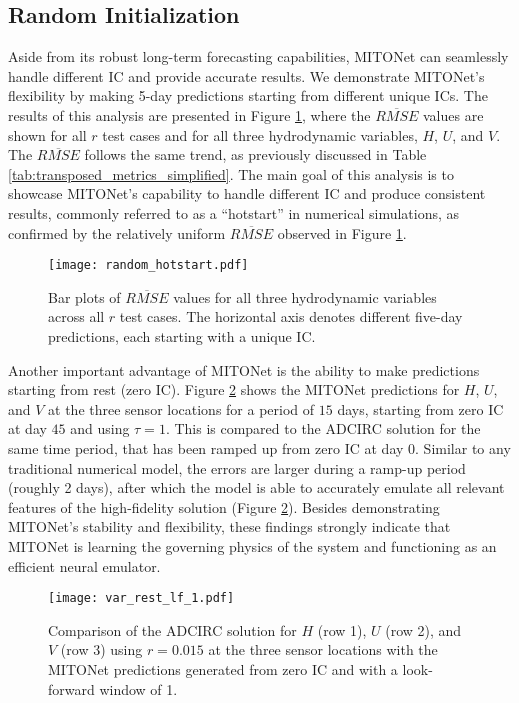 \documentclass[draft]{agujournal2019}
\begin{document}
\subsection{Random Initialization}

Aside from its robust long-term forecasting capabilities, MITONet can seamlessly handle different IC and provide accurate results. We demonstrate MITONet's flexibility by making 5-day predictions starting from different unique ICs. The results of this analysis are presented in Figure \ref{fig:random_hot}, where the $\overline{RMSE}$ values are shown for all $r$ test cases and for all three hydrodynamic variables, $H$, $U$, and $V$. The $\overline{RMSE}$ follows the same trend, as previously discussed in Table \ref{tab:transposed_metrics_simplified}. The main goal of this analysis is to showcase MITONet's capability to handle different IC and produce consistent results, commonly referred to as a ``hotstart'' in numerical simulations, as confirmed by the relatively uniform $\overline{RMSE}$ observed in Figure \ref{fig:random_hot}. 

\begin{figure}[h]
    \centering
    \texttt{[image: random\_hotstart.pdf]}
    \caption{Bar plots of $\overline{RMSE}$ values for all three hydrodynamic variables across all $r$ test cases. The horizontal axis denotes different five-day predictions, each starting with a unique IC.}
    \label{fig:random_hot}
\end{figure}

Another important advantage of MITONet is the ability to make predictions starting from rest (zero IC). Figure \ref{fig:var_rest} shows the MITONet predictions for $H$, $U$, and $V$ at the three sensor locations for a period of $15$ days, starting from zero IC at day $45$ and using $\tau=1$. This is compared to the ADCIRC solution for the same time period, that has been ramped up from zero IC at day $0$. Similar to any traditional numerical model, the errors are larger during a ramp-up period (roughly 2 days), after which the model is able to accurately emulate all relevant features of the high-fidelity solution (Figure \ref{fig:var_rest}). Besides demonstrating MITONet’s stability and flexibility, these findings strongly indicate that MITONet is learning the governing physics of the system and functioning as an efficient neural emulator.

\begin{figure}[h]
    \centering
    \texttt{[image: var\_rest\_lf\_1.pdf]}
    \caption{Comparison of the ADCIRC solution for $H$ (row 1), $U$ (row 2), and $V$ (row 3) using $r=0.015$ at the three sensor locations with the MITONet predictions generated from zero IC and with a look-forward window of 1.}
    \label{fig:var_rest}
\end{figure}
\end{document}
